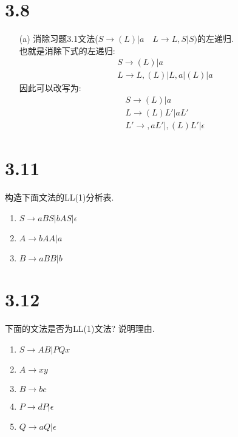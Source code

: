 \documentclass[UTF8]{article}
\begin{document}
\section*{3.8}
\begin{enumerate}
\item[(a) ] 消除习题3.1文法($S\rightarrow (L)|a\quad L\rightarrow L,S|S)$的左递归.\\
	也就是消除下式的左递归:
	$$\begin{array}{l}
	S \rightarrow (L)|a\\
	L \rightarrow L,(L)|L,a|(L)|a
	\end{array}$$
	因此可以改写为:
	$$\begin{array}{l}
	S \rightarrow (L)|a\\
	L \rightarrow (L)L'|aL'\\
	L' \rightarrow ,aL'|,(L)L'|\epsilon
	\end{array}$$
\end{enumerate}

\section*{3.11}
\noindent 构造下面文法的LL(1)分析表.
\begin{enumerate}
\item $S\rightarrow aBS|bAS|\epsilon$
\item $A\rightarrow bAA|a$
\item $B\rightarrow aBB|b$
\end{enumerate}

\section*{3.12}
\noindent 下面的文法是否为LL(1)文法? 说明理由.
\begin{enumerate}
\item $S \rightarrow AB|PQx$
\item $A \rightarrow xy$
\item $B \rightarrow bc$
\item $P \rightarrow dP|\epsilon$
\item $Q \rightarrow aQ|\epsilon$
\end{enumerate}
\end{document}

